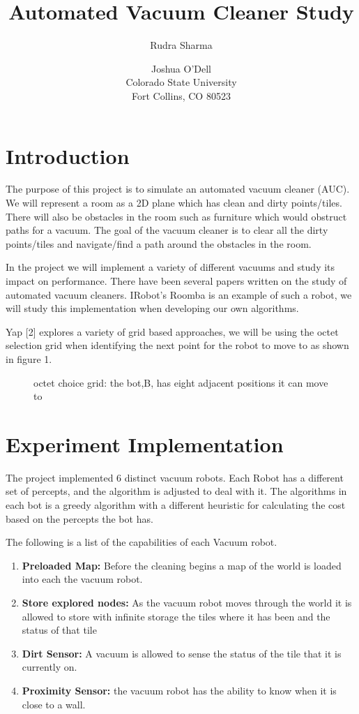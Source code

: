 \documentclass[letterpaper]{article}
\title{Automated Vacuum Cleaner Study}
\author{Rudra Sharma \and Joshua O'Dell \\ Colorado State University \\ Fort Collins, CO 80523 }
\begin{document}
\maketitle

\section{Introduction}

The purpose of this project is to simulate an automated vacuum cleaner (AUC). We will represent a room as a 2D plane which has clean and dirty points/tiles. There will also be obstacles in the room such as furniture which would obstruct paths for a vacuum. The goal of the vacuum cleaner is to clear all the dirty points/tiles and navigate/find a path around the obstacles in the room.

In the project we will implement a variety of different vacuums and study its impact on performance. There have been several papers written on the study of automated vacuum cleaners. IRobot’s Roomba is an example of such a robot, we will study this implementation when developing our own algorithms.

Yap [2] explores a variety of grid based approaches, we will be using the octet selection grid when identifying the next point for the robot to move to as shown in figure 1. 

\begin{figure}[h]
\caption{ octet choice grid: the bot,B, has eight adjacent positions it can move to}
\end{figure}
\section{Experiment Implementation}

The project implemented 6 distinct vacuum robots.  Each Robot has a different set of percepts, and the algorithm is adjusted to deal with it. The algorithms in each bot is a greedy algorithm with a different heuristic for calculating the cost based on the percepts the bot has. 

The following is a list of the capabilities of each Vacuum robot.
\begin{enumerate}  
\item \textbf{Preloaded Map:} Before the cleaning begins a map of the world is loaded into each the vacuum robot.
\item \textbf{Store explored nodes:} As the vacuum robot moves through the world it is allowed to store with infinite storage the tiles where it has been and the status of that tile
\item \textbf{Dirt Sensor:} A vacuum is allowed to sense the status of the tile that it is currently on.
\item \textbf{Proximity Sensor:} the vacuum robot has the ability to know when it is close to a wall.
\end{enumerate}  
\end{document}
